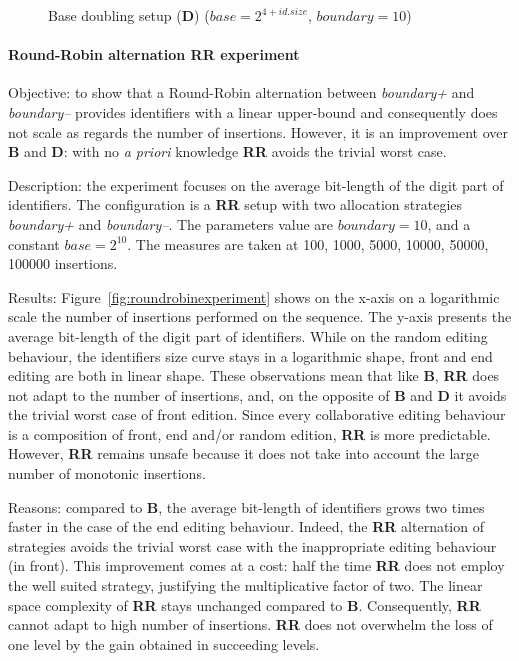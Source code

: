 \begin{figure}
\small
\begin{center}

\caption{Base doubling setup (\textbf{D}) ($base=2^{4+id.size}$,
  $boundary=10$)}
\label{fig:doubleexperiment}
\end{center}
\end{figure}

\paragraph{Round-Robin alternation \textbf{RR} experiment}

\begin{asparadesc}
\item[Objective:] to show that a Round-Robin alternation between
  \emph{boundary+} and \emph{boundary--} provides identifiers with a linear
  upper-bound and consequently does not scale as regards the number of
  insertions.  However, it is an improvement over \textbf{B} and \textbf{D}:
  with no \emph{a priori} knowledge \textbf{RR} avoids the trivial worst case.

\item[Description:] the experiment focuses on the average bit-length of the
  digit part of identifiers. The configuration is a \textbf{RR} setup with two
  allocation strategies \emph{boundary+} and \emph{boundary--}. The parameters
  value are $boundary=10$, and a constant $base=2^{10}$. The measures are taken
  at 100, 1000, 5000, 10000, 50000, 100000 insertions.

\item[Results:] Figure~\ref{fig:roundrobinexperiment} shows on the x-axis on a
  logarithmic scale the number of insertions performed on the sequence. The
  y-axis presents the average bit-length of the digit part of identifiers.
  While on the random editing behaviour, the identifiers size curve stays in a
  logarithmic shape, front and end editing are both in linear shape. These
  observations mean that like \textbf{B}, \textbf{RR} does not adapt to the
  number of insertions, and, on the opposite of \textbf{B} and \textbf{D} it
  avoids the trivial worst case of front edition. Since every collaborative
  editing behaviour is a composition of front, end and/or random edition,
  \textbf{RR} is more predictable. However, \textbf{RR} remains unsafe because
  it does not take into account the large number of monotonic insertions.

\item[Reasons:] compared to \textbf{B}, the average bit-length of identifiers
  grows two times faster in the case of the end editing behaviour. Indeed, the
  \textbf{RR} alternation of strategies avoids the trivial worst case with the
  inappropriate editing behaviour (in front). This improvement comes at a cost:
  half the time \textbf{RR} does not employ the well suited strategy,
  justifying the multiplicative factor of two. The linear space complexity of
  \textbf{RR} stays unchanged compared to \textbf{B}. Consequently, \textbf{RR}
  cannot adapt to high number of insertions. \textbf{RR} does not overwhelm the
  loss of one level by the gain obtained in succeeding levels.
\end{asparadesc}


